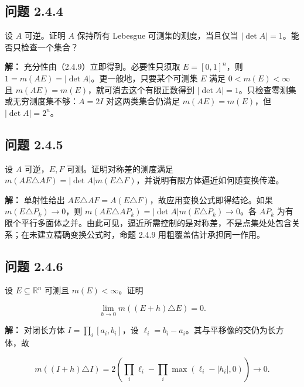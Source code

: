 \documentclass[11pt,a4paper]{article}
\begin{document}
\subsection{问题 2.4.4}\label{ux95eeux9898-2.4.4}

设 \(A\) 可逆。证明 \(A\) 保持所有 Lebesgue 可测集的测度，当且仅当
\(|\det A|=1\)。能否只检查一个集合？

\textbf{解：} 充分性由（2.4.9）立即得到。必要性只须取 \(E=[0,1]^n\)，则
\(1=m(AE)=|\det A|\)。更一般地，只要某个可测集 \(E\) 满足
\(0<m(E)<\infty\) 且 \(m(AE)=m(E)\)，就可消去这个有限正数得到
\(|\det A|=1\)。只检查零测集或无穷测度集不够：\(A=2I\)
对这两类集合仍满足 \(m(AE)=m(E)\)，但 \(|\det A|=2^n\)。

\subsection{问题 2.4.5}\label{ux95eeux9898-2.4.5}

设 \(A\) 可逆，\(E,F\) 可测。证明对称差的测度满足
\(m(AE\triangle AF)=|\det A|m(E\triangle F)\)，并说明有限方体逼近如何随变换传递。

\textbf{解：} 单射性给出
\(AE\triangle AF=A(E\triangle F)\)，故应用变换公式即得结论。如果
\(m(E\triangle P_k)\to0\)，则
\(m(AE\triangle AP_k)=|\det A|m(E\triangle P_k)\to0\)。各 \(AP_k\)
为有限个平行多面体之并。由此可见，逼近所需控制的是对称差，不是点集处处包含关系；在未建立精确变换公式时，命题
2.4.9 用粗覆盖估计承担同一作用。

\subsection{问题 2.4.6}\label{ux95eeux9898-2.4.6}

设 \(E\subseteq\mathbb R^n\) 可测且 \(m(E)<\infty\)。证明

\begin{equation*}
\lim_{h\to0}m((E+h)\triangle E)=0.
\tag{2.4.18}
\end{equation*}

\textbf{解：} 对闭长方体 \(I=\prod_i[a_i,b_i]\)，设
\(\ell_i=b_i-a_i\)。其与平移像的交仍为长方体，故

\begin{equation*}
m((I+h)\triangle I)=2\left(\prod_i\ell_i-\prod_i\max(\ell_i-|h_i|,0)\right)\longrightarrow0.
\end{equation*}
\end{document}
